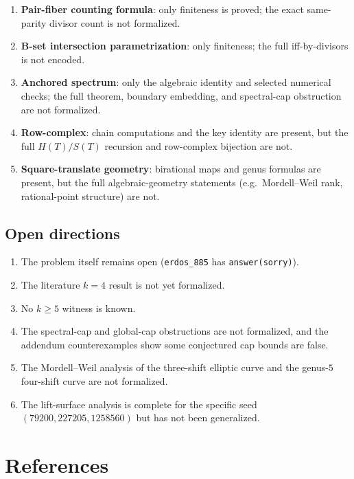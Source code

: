 \documentclass[11pt,a4paper]{article}
\theoremstyle{definition}
\theoremstyle{remark}
\begin{document}
\begin{enumerate}[nosep]
\item \textbf{Pair-fiber counting formula}: only finiteness is proved;
      the exact same-parity divisor count is not formalized.
\item \textbf{B-set intersection parametrization}: only finiteness;
      the full iff-by-divisors is not encoded.
\item \textbf{Anchored spectrum}: only the algebraic identity and
      selected numerical checks; the full theorem, boundary embedding,
      and spectral-cap obstruction are not formalized.
\item \textbf{Row-complex}: chain computations and the key identity are
      present, but the full $H(T)/S(T)$ recursion and row-complex
      bijection are not.
\item \textbf{Square-translate geometry}: birational maps and genus
      formulas are present, but the full algebraic-geometry statements
      (e.g.\ Mordell--Weil rank, rational-point structure) are not.
\end{enumerate}

\subsection{Open directions}

\begin{enumerate}[nosep]
\item The problem itself remains open (\texttt{erdos\_885} has
      \texttt{answer(sorry)}).
\item The literature $k=4$ result is not yet formalized.
\item No $k\ge 5$ witness is known.
\item The spectral-cap and global-cap obstructions are not formalized,
      and the addendum counterexamples show some conjectured cap bounds
      are false.
\item The Mordell--Weil analysis of the three-shift elliptic curve and
      the genus-$5$ four-shift curve are not formalized.
\item The lift-surface analysis is complete for the specific seed
      $(79200,227205,1258560)$ but has not been generalized.
\end{enumerate}

\section*{References}
\end{document}
